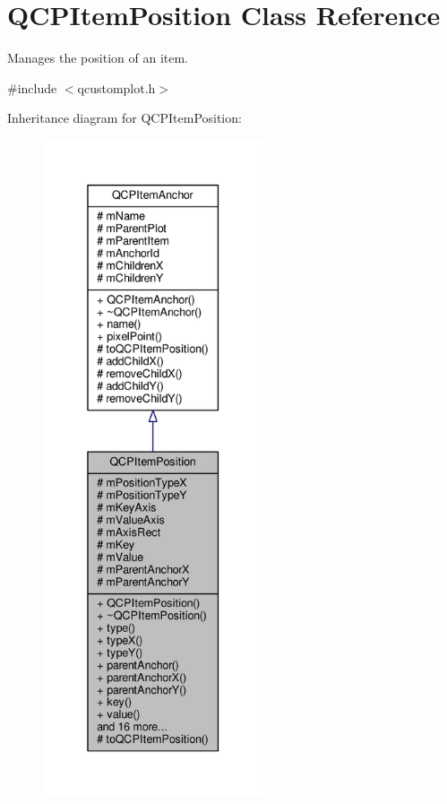 \hypertarget{class_q_c_p_item_position}{}\section{Q\+C\+P\+Item\+Position Class Reference}
\label{class_q_c_p_item_position}


Manages the position of an item.  




{\ttfamily \#include $<$qcustomplot.\+h$>$}



Inheritance diagram for Q\+C\+P\+Item\+Position\+:\nopagebreak
\begin{figure}[H]
\begin{center}
\leavevmode
\includegraphics[height=550pt]{class_q_c_p_item_position__inherit__graph}
\end{center}
\end{figure}


